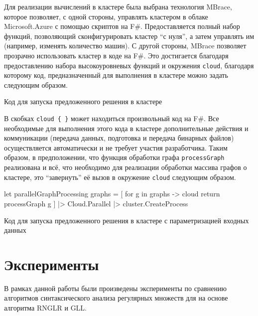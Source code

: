 \documentclass[14pt]{matmex-diploma}
\begin{document}
Для реализации вычислений в кластере была выбрана технология MBrace, которое позволяет, с одной стороны, управлять кластером в облаке Microsoft.Azure с помощью скриптов на F\#. Предоставляется полный набор функций, позволяющий сконфигурировать кластер ``с нуля'', а затем управлять им (например, изменять количество машин). С другой стороны, MBrace позволяет прозрачно использовать кластер в коде на F\#. Это достигается благодаря предоставлению набора высокоуровневых функций и окружения \texttt{cloud}, благодаря которому код, предназначенный для выполнения в кластере можно задать следующим образом.

\begin{listing}
\caption{Код для запуска предложенного решения в кластере}
\label{lst:mbraceExample}
\end{listing}

В скобках \verb|cloud { }| может находиться произвольный код на F\#. Все необходимые для выполнения этого кода в кластере дополнительные действия и коммуникации (передача данных, подготовка и передача бинарных файлов) осуществляется автоматически и не требует участия разработчика. Таким образом, в предположении, что функция обработки графа \texttt{processGraph}  реализована и всё, что необходимо для реализации обработки массива графов о кластере, это ``завернуть'' её вызов в окружение \texttt{cloud} следующим образом.

\begin{listing}
    \begin{pyglist}[language=ocaml,numbers=left,numbersep=5pt]
    
let parallelGraphProcessing graphs = 
    [ for g in graphs -> cloud { return processGraph g } ]
    |> Cloud.Parallel
    |> cluster.CreateProcess

\end{pyglist}
\caption{Код для запуска предложенного решения в кластере с параметризацией входных данных}
\label{lst:mbraceExample}
\end{listing}

\section{Эксперименты}
В рамках данной работы были произведены эксперименты по сравнению алгоритмов синтаксического анализа регулярных множеств для на основе алгоритма RNGLR и GLL. 
\end{document}
